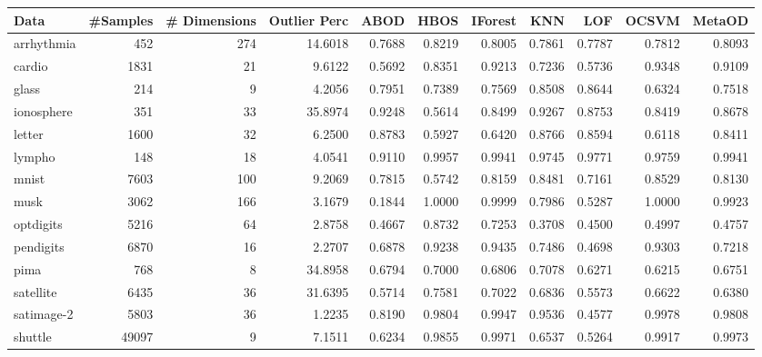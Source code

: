 \begin{sidewaystable}
    \centering
\begin{tabular}{lrrrrrrrrrr}
\toprule
      Data &  \#Samples &  \# Dimensions &  Outlier Perc &   ABOD &   HBOS &  IForest &    KNN &    LOF &  OCSVM &  MetaOD \\
\midrule
arrhythmia &       452 &           274 &       14.6018 & 0.7688 & 0.8219 &   0.8005 & 0.7861 & 0.7787 & 0.7812 &  0.8093 \\
    cardio &      1831 &            21 &        9.6122 & 0.5692 & 0.8351 &   0.9213 & 0.7236 & 0.5736 & 0.9348 &  0.9109 \\
     glass &       214 &             9 &        4.2056 & 0.7951 & 0.7389 &   0.7569 & 0.8508 & 0.8644 & 0.6324 &  0.7518 \\
ionosphere &       351 &            33 &       35.8974 & 0.9248 & 0.5614 &   0.8499 & 0.9267 & 0.8753 & 0.8419 &  0.8678 \\
    letter &      1600 &            32 &        6.2500 & 0.8783 & 0.5927 &   0.6420 & 0.8766 & 0.8594 & 0.6118 &  0.8411 \\
    lympho &       148 &            18 &        4.0541 & 0.9110 & 0.9957 &   0.9941 & 0.9745 & 0.9771 & 0.9759 &  0.9941 \\
     mnist &      7603 &           100 &        9.2069 & 0.7815 & 0.5742 &   0.8159 & 0.8481 & 0.7161 & 0.8529 &  0.8130 \\
      musk &      3062 &           166 &        3.1679 & 0.1844 & 1.0000 &   0.9999 & 0.7986 & 0.5287 & 1.0000 &  0.9923 \\
 optdigits &      5216 &            64 &        2.8758 & 0.4667 & 0.8732 &   0.7253 & 0.3708 & 0.4500 & 0.4997 &  0.4757 \\
 pendigits &      6870 &            16 &        2.2707 & 0.6878 & 0.9238 &   0.9435 & 0.7486 & 0.4698 & 0.9303 &  0.7218 \\
      pima &       768 &             8 &       34.8958 & 0.6794 & 0.7000 &   0.6806 & 0.7078 & 0.6271 & 0.6215 &  0.6751 \\
 satellite &      6435 &            36 &       31.6395 & 0.5714 & 0.7581 &   0.7022 & 0.6836 & 0.5573 & 0.6622 &  0.6380 \\
satimage-2 &      5803 &            36 &        1.2235 & 0.8190 & 0.9804 &   0.9947 & 0.9536 & 0.4577 & 0.9978 &  0.9808 \\
   shuttle &     49097 &             9 &        7.1511 & 0.6234 & 0.9855 &   0.9971 & 0.6537 & 0.5264 & 0.9917 &  0.9973 \\

\end{tabular}
\end{sidewaystable}
